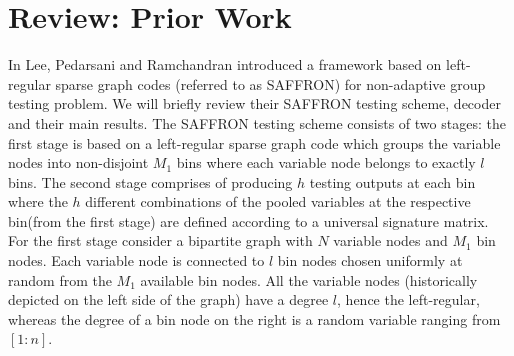 \documentclass[conference,twocolumn]{IEEEtran}
\DeclareMathOperator*{\bigORtxt}{\scalerel*{\text{$\vee$}}{\textstyle\sum}}
\begin{document}
%

\section{Review: Prior Work}
In \cite{lee2015saffron} Lee, Pedarsani and Ramchandran introduced a framework based on left-regular sparse graph codes (referred to as SAFFRON) for non-adaptive group testing problem. We will briefly review their SAFFRON testing scheme, decoder and their main results. The SAFFRON testing scheme consists of two stages: the first stage is based on a left-regular sparse graph code which groups the variable nodes into non-disjoint $M_1$ bins where each variable node belongs to exactly $l$ bins. The second stage comprises of producing $h$ testing outputs at each bin where the $h$ different combinations of the pooled variables at the respective bin(from the first stage) are defined according to a universal signature matrix. For the first stage consider a bipartite graph with $N$ variable nodes and $M_1$ bin nodes. Each variable node is connected to $l$ bin nodes chosen uniformly at random from the $M_1$ available bin nodes. All the variable nodes (historically depicted on the left side of the graph) have a degree $l$, hence the left-regular, whereas the degree of a bin node on the right is a random variable ranging from $[1:n]$.
\end{document}
